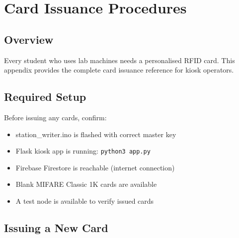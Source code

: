 \chapter{Card Issuance Procedures}
\label{app:card_issuance}

\section{Overview}

Every student who uses lab machines needs a personalised RFID card. This appendix provides the complete card issuance reference for kiosk operators.

\section{Required Setup}

Before issuing any cards, confirm:
\begin{itemize}[leftmargin=1.5em,noitemsep]
    \item station\_writer.ino is flashed with correct master key
    \item Flask kiosk app is running: \texttt{python3 app.py}
    \item Firebase Firestore is reachable (internet connection)
    \item Blank MIFARE Classic 1K cards are available
    \item A test node is available to verify issued cards
\end{itemize}

\section{Issuing a New Card}

